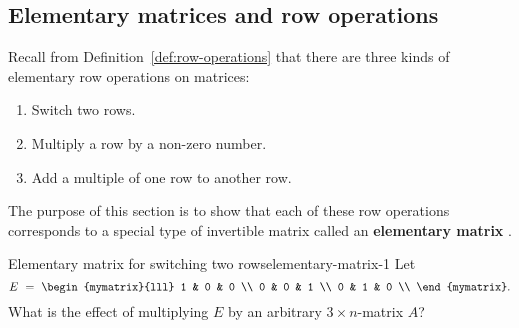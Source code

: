 \subsection{Elementary matrices and row operations}

Recall from Definition~\ref{def:row-operations} that there are three
kinds of elementary row operations%
%
%
%
 on matrices:
\begin{enumerate}
\item Switch two rows.
\item Multiply a row by a non-zero number.
\item Add a multiple of one row to another row.
\end{enumerate}
The purpose of this section is to show that each of these row
operations corresponds to a special type of invertible matrix called
an \textbf{elementary matrix}%
%
.

\begin{example}{Elementary matrix for switching two rows}{elementary-matrix-1}
  Let
  \begin{equation*}
    E ~=~ \begin{mymatrix}{lll}
      1 & 0 & 0 \\
      0 & 0 & 1 \\
      0 & 1 & 0 \\
    \end{mymatrix}.
  \end{equation*}
  What is the effect of multiplying $E$ by an arbitrary $3\times
  n$-matrix $A$?
\end{example}

